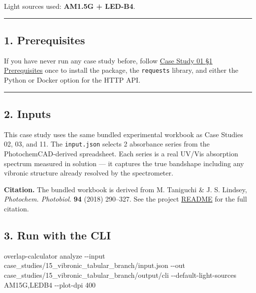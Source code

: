 \documentclass[
  11pt,
]{article}
\newenvironment{Shaded}{}{}
\newcommand{\AttributeTok}[1]{\textcolor[rgb]{0.49,0.56,0.16}{#1}}
\newcommand{\ExtensionTok}[1]{#1}
\newcommand{\NormalTok}[1]{#1}
\begin{document}
Light sources used: \textbf{AM1.5G + LED-B4}.

\begin{center}\rule{0.5\linewidth}{0.5pt}\end{center}

\hypertarget{1-prerequisites}{
\subsection{1. Prerequisites}\label{1-prerequisites}}

If you have never run any case study before, follow
\href{https://github.com/pinarsyt/overlap-calculator/blob/main/case_studies/01_theoretical_only/README.md\#1-prerequisites}{Case
Study 01 \S1 Prerequisites} once to install the package, the
\texttt{requests} library, and either the Python or Docker option for
the HTTP API.

\begin{center}\rule{0.5\linewidth}{0.5pt}\end{center}

\hypertarget{2-inputs}{
\subsection{2. Inputs}\label{2-inputs}}

This case study uses the same bundled experimental workbook as Case
Studies 02, 03, and 11. The \texttt{input.json} selects 2 absorbance
series from the PhotochemCAD-derived spreadsheet. Each series is a real
UV/Vis absorption spectrum measured in solution --- it captures the true
bandshape including any vibronic structure already resolved by the
spectrometer.

\textbf{Citation.} The bundled workbook is derived from M. Taniguchi \&
J. S. Lindsey, \emph{Photochem. Photobiol.} \textbf{94} (2018)
290--327. See the project
\href{https://github.com/pinarsyt/overlap-calculator/blob/main/README.md\#acknowledgement-of-third-party-data}{README}
for the full citation.

\hypertarget{3-run-with-the-cli}{
\subsection{3. Run with the CLI}\label{3-run-with-the-cli}}

\begin{Shaded}
\begin{Highlighting}[]
\ExtensionTok{overlap{-}calculator}\NormalTok{ analyze }\AttributeTok{{-}{-}input}\NormalTok{ case\_studies/15\_vibronic\_tabular\_branch/input.json }\AttributeTok{{-}{-}out}\NormalTok{ case\_studies/15\_vibronic\_tabular\_branch/output/cli }\AttributeTok{{-}{-}default{-}light{-}sources}\NormalTok{ AM15G,LEDB4 }\AttributeTok{{-}{-}plot{-}dpi}\NormalTok{ 400}
\end{Highlighting}
\end{Shaded}
\end{document}
